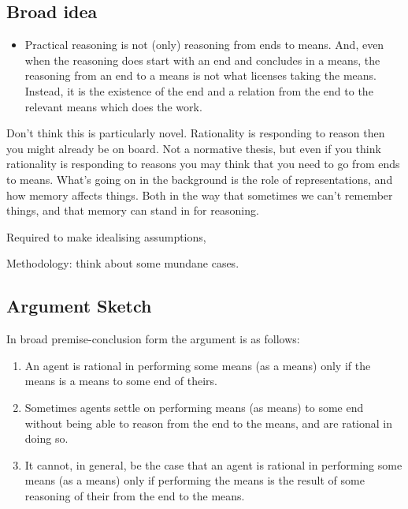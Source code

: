 \documentclass[10pt]{article}
\newcommand{\hand}{\ding{43}}
\newcommand{\hozline}[0]{%
  \noindent\hdashrule[0.5ex][c]{\textwidth}{.1pt}{}
}
\begin{document}
\subsection*{Broad idea}
\label{sec:broad-idea}
\begin{itemize}
\item[\hand]  Practical reasoning is not (only) reasoning from ends to means.
  And, even when the reasoning does start with an end and concludes in a means, the reasoning from an end to a means is not what licenses taking the means.
  Instead, it is the existence of the end and a relation from the end to the relevant means which does the work.
\end{itemize}

\hozline

Don't think this is particularly novel.
Rationality is responding to reason then you might already be on board.
Not a normative thesis, but even if you think rationality is responding to reasons you may think that you need to go from ends to means.
What's going on in the background is the role of representations, and how memory affects things.
Both in the way that sometimes we can't remember things, and that memory can stand in for reasoning.

Required to make idealising assumptions,



Methodology: think about some mundane cases.


\hozline

\subsection*{Argument Sketch}
\label{sec:argument-sketch}

In broad premise-conclusion form the argument is as follows:

\begin{enumerate}[label=\arabic*., ref=(\arabic*)]
\item\label{ao:em} An agent is rational in performing some means (as a means) only if the means is a means to some end of theirs.
\item\label{ao:mNr} Sometimes agents settle on performing means (as means) to some end without being able to reason from the end to the means, and are rational in doing so.
\item\label{ao:Nrremr} It cannot, in general, be the case that an agent is rational in performing some means (as a means) only if performing the means is the result of some reasoning of their from the end to the means.
\end{enumerate}
\end{document}
